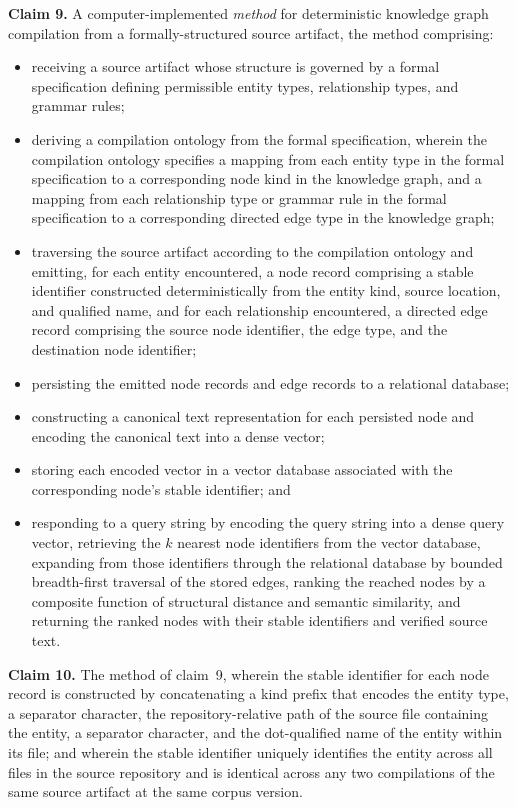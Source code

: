 \documentclass[12pt]{article}
\begin{document}
\bigskip
\noindent\textbf{Claim 9.}\quad
A computer-implemented \emph{method} for deterministic knowledge graph compilation
from a formally-structured source artifact, the method comprising:
\begin{itemize}[leftmargin=2.5em]
  \item receiving a source artifact whose structure is governed by a formal
    specification defining permissible entity types, relationship types, and
    grammar rules;
  \item deriving a compilation ontology from the formal specification, wherein the
    compilation ontology specifies a mapping from each entity type in the formal
    specification to a corresponding node kind in the knowledge graph, and a
    mapping from each relationship type or grammar rule in the formal
    specification to a corresponding directed edge type in the knowledge graph;
  \item traversing the source artifact according to the compilation ontology and
    emitting, for each entity encountered, a node record comprising a stable
    identifier constructed deterministically from the entity kind, source
    location, and qualified name, and for each relationship encountered, a
    directed edge record comprising the source node identifier, the edge type,
    and the destination node identifier;
  \item persisting the emitted node records and edge records to a relational
    database;
  \item constructing a canonical text representation for each persisted node and
    encoding the canonical text into a dense vector;
  \item storing each encoded vector in a vector database associated with the
    corresponding node's stable identifier; and
  \item responding to a query string by encoding the query string into a dense
    query vector, retrieving the $k$ nearest node identifiers from the vector
    database, expanding from those identifiers through the relational database by
    bounded breadth-first traversal of the stored edges, ranking the reached
    nodes by a composite function of structural distance and semantic similarity,
    and returning the ranked nodes with their stable identifiers and verified
    source text.
\end{itemize}

\bigskip
\noindent\textbf{Claim 10.}\quad
The method of claim~9, wherein the stable identifier for each node record is
constructed by concatenating a kind prefix that encodes the entity type, a
separator character, the repository-relative path of the source file containing
the entity, a separator character, and the dot-qualified name of the entity
within its file; and wherein the stable identifier uniquely identifies the entity
across all files in the source repository and is identical across any two
compilations of the same source artifact at the same corpus version.
\end{document}
